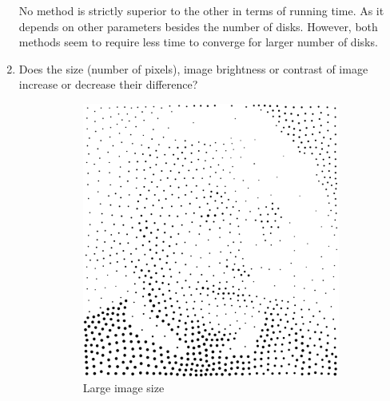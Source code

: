\documentclass[11pt]{article}
\begin{document}
\begin{enumerate}
No method is strictly superior to the other in terms of running time. As it depends on other parameters besides the number of disks. However, both methods seem to require less time to converge for larger number of disks.

\item Does the size (number of pixels), image brightness or contrast of image increase or decrease their difference?

\begin{figure}[H]
    \centering
        \begin{subfigure}{0.4\textwidth}
        \centering
        \includegraphics[width=\textwidth]{../results/hedcuter/3-5.pdf}
         \caption{Large image size}
    \end{subfigure}
    \begin{subfigure}{0.4\textwidth}
        \centering

\end{subfigure}
\end{figure}
\end{enumerate}
\end{document}
